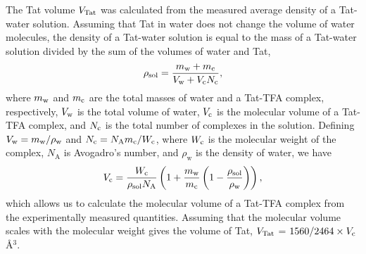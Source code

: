 The Tat volume $V_\textrm{Tat}$ was calculated from the measured average density of a 
Tat-water solution. Assuming that Tat
in water does not change the volume of water molecules, the density
of a Tat-water solution is equal to the mass of a Tat-water solution divided
by the sum of the volumes of water and Tat, 
\begin{equation}
  \rho_\textrm{sol} = \frac{m_\textrm{w}+m_\textrm{c}}{V_\textrm{w}+V_\textrm{c}N_\textrm{c}},
\end{equation}
where $m_\textrm{w}$ and $m_\textrm{c}$
are the total masses of water and a Tat-TFA complex, respectively, 
$V_\textrm{w}$ is the total volume of 
water, $V_\textrm{c}$ is the molecular volume of a Tat-TFA complex, and $N_\textrm{c}$ is the total number 
of complexes in the solution. 
Defining $V_\textrm{w}=m_\textrm{w}/\rho_\textrm{w}$ 
and $N_\textrm{c}=N_\textrm{A}m_\textrm{c}/W_\textrm{c}$, 
where $W_\textrm{c}$ is the molecular weight of the complex, 
$N_\textrm{A}$ is Avogadro's number,
and $\rho_\textrm{w}$ is the density of water, we have
\begin{equation}
  V_\textrm{c} = \frac{W_\textrm{c}}{\rho_\textrm{sol}N_\textrm{A}} \left( 
        1 + \frac{m_\textrm{w}}{m_\textrm{c}}\left(1-\frac{\rho_\textrm{sol}}{\rho_\textrm{w}}\right) 
        \right),
\end{equation}
which allows us to calculate the molecular volume of a Tat-TFA complex 
from the experimentally measured quantities. 
Assuming that the molecular
volume scales with the molecular weight gives the volume of Tat, 
$V_\textrm{Tat}$ = $1560/2464\times V_\textrm{c}$ \AA$^3$. 

